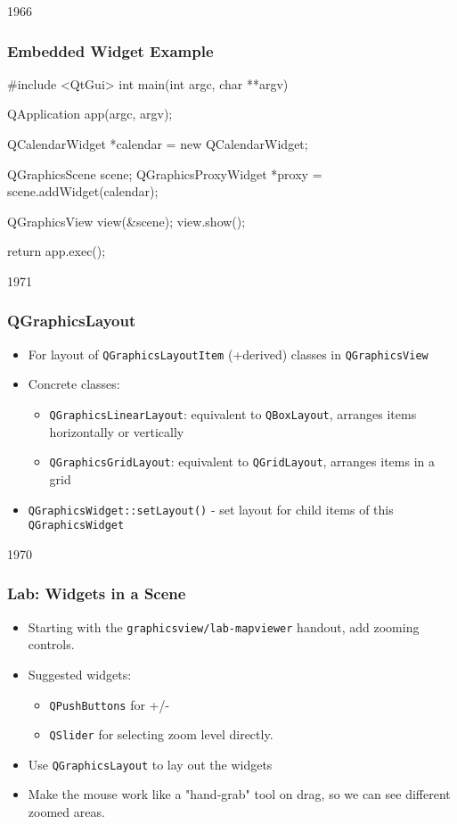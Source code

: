 \begin{slide}[fragile]{1966}


\frametitle{Embedded Widget Example}
\begin{cpp}
#include <QtGui>
int main(int argc, char **argv) {
   QApplication app(argc, argv);

   QCalendarWidget *calendar = new QCalendarWidget;

   QGraphicsScene scene;
   QGraphicsProxyWidget *proxy = scene.addWidget(calendar);

   QGraphicsView view(&scene);
   view.show();

   return app.exec();
}
\end{cpp}
\end{slide}

\begin{slide}{1971}
\frametitle{QGraphicsLayout}

\begin{itemize}

\item For layout of \texttt{QGraphicsLayoutItem} (+derived) classes in \texttt{QGraphicsView}
\item Concrete classes:
    \begin{itemize}
    \item \texttt{QGraphicsLinearLayout}: equivalent to \texttt{QBoxLayout}, arranges items horizontally or vertically
    \item \texttt{QGraphicsGridLayout}: equivalent to \texttt{QGridLayout}, arranges items in a grid
    \end{itemize}
\item \texttt{QGraphicsWidget::setLayout()} - set layout for child items of this \texttt{QGraphicsWidget}
\end{itemize}

\end{slide}

\begin{slide}{1970}
\frametitle{Lab: Widgets in a Scene}
\begin{itemize}
\item Starting with the \texttt{graphicsview/lab-mapviewer} handout, add zooming controls.
\item Suggested widgets:
    \begin{itemize}
    \item \texttt{QPushButtons} for +/-
    \item \texttt{QSlider} for selecting zoom level directly. 
    \end{itemize}
\item Use \texttt{QGraphicsLayout} to lay out the widgets
\item Make the mouse work like a "hand-grab" tool on drag, so we can see different zoomed areas. 
\end{itemize}
\end{slide}


